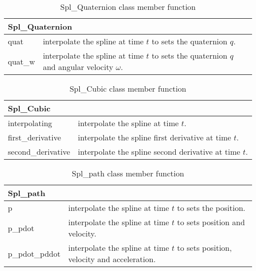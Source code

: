 \documentclass[dvips,11pt,fleqn]{report}
\begin{document}
\begin{table}[htbp]
\caption{Spl\_Quaternion class member function}
\label{tab:commandsum1b}
\begin{center}
\begin{tabular}{||l|l||}
\hline
\hline
\multicolumn{2}{||l||}{{\bf Spl\_Quaternion}} \\
\hline
\hline
quat & interpolate the spline at time $t$ to sets the quaternion $q$. \\
\hline
quat\_w & interpolate the spline at time $t$ to sets the quaternion
$q$ and angular velocity $\omega$. \\
\hline
\hline
\end{tabular}
\end{center}
\end{table}

\begin{table}[htbp]
\caption{Spl\_Cubic class member function}
\label{tab:commandsum1c}
\begin{center}
\begin{tabular}{||l|l||}
\hline
\hline
\multicolumn{2}{||l||}{{\bf Spl\_Cubic}} \\
\hline
\hline
interpolating & interpolate the spline at time $t$. \\
\hline
first\_derivative & interpolate the spline first derivative at time $t$. \\
\hline
second\_derivative & interpolate the spline second derivative at time $t$. \\
\hline
\hline
\end{tabular}
\end{center}
\end{table}

\begin{table}[htbp]
\caption{Spl\_path class member function}
\label{tab:commandsum1d}
\begin{center}
\begin{tabular}{||l|l||}
\hline
\hline
\multicolumn{2}{||l||}{{\bf Spl\_path}} \\
\hline
\hline
p & interpolate the spline at time $t$ to sets the position. \\
\hline
p\_pdot & interpolate the spline at time $t$ to sets position and velocity. \\
\hline
p\_pdot\_pddot & interpolate the spline at time $t$ to sets position,
velocity and acceleration. \\
\hline
\hline
\end{tabular}
\end{center}
\end{table}
\end{document}
